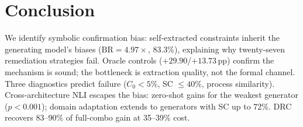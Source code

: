 \vspace{-2mm}
\section{Conclusion}\label{sec:conclusion}

 We identify symbolic confirmation bias: self-extracted constraints inherit the generating model's biases ($\text{BR} = 4.97\times$, 83.3\%), explaining why twenty-seven remediation strategies fail. Oracle controls ($+29.90$/$+13.73$\,pp) confirm the mechanism is sound; the bottleneck is extraction quality, not the formal channel. Three diagnostics predict failure ($C_0 < 5\%$, SC $\leq 40\%$, process similarity). Cross-architecture NLI escapes the bias: zero-shot gains for the weakest generator ($p < 0.001$); domain adaptation extends to generators with SC up to 72\%. DRC recovers 83--90\% of full-combo gain at 35--39\% cost.
